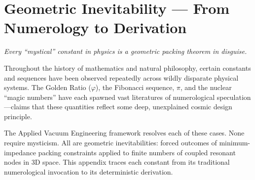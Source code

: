 \chapter{Geometric Inevitability --- From Numerology to Derivation}
\label{app:geometric_inevitability}

\textit{Every ``mystical'' constant in physics is a geometric packing theorem in disguise.}

\vspace{1em}

Throughout the history of mathematics and natural philosophy, certain constants and sequences have been observed repeatedly across wildly disparate physical systems. The Golden Ratio ($\varphi$), the Fibonacci sequence, $\pi$, and the nuclear ``magic numbers'' have each spawned vast literatures of numerological speculation---claims that these quantities reflect some deep, unexplained cosmic design principle.

The Applied Vacuum Engineering framework resolves each of these cases. None require mysticism. All are geometric inevitabilities: forced outcomes of minimum-impedance packing constraints applied to finite numbers of coupled resonant nodes in 3D space. This appendix traces each constant from its traditional numerological invocation to its deterministic derivation.

